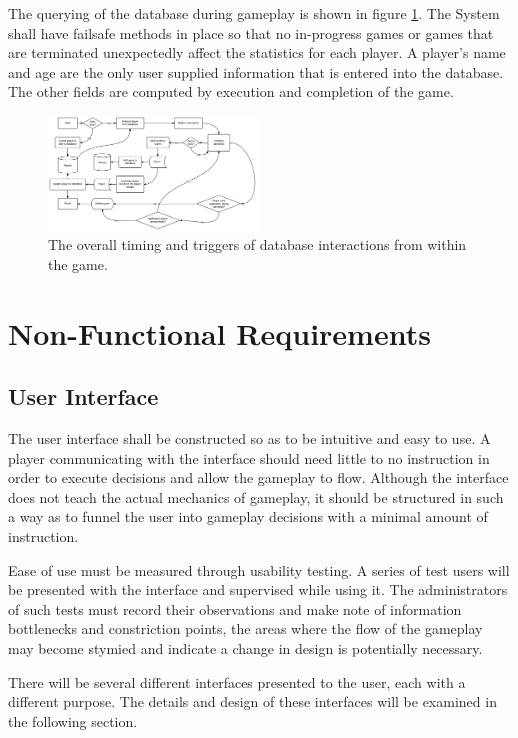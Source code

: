 \documentclass[12pt]{IEEEtran}
\begin{document}
	The querying of the database during gameplay is shown in figure \ref{fig:dbflow}. The System shall have failsafe 			methods in place so that no in-progress games or games that are terminated unexpectedly affect the statistics for each 		player. A player's name and age are the only user supplied information that is entered into the database. The other 			fields are computed by execution and completion of the game.

	\begin{figure}[b]	
		\centering
		\includegraphics[width=0.5\textwidth]{DatabaseFlowChart.png}
		\caption[Database Query Flow]{ The overall timing and triggers of database interactions from within the game.  }
		\label{fig:dbflow}
	\end{figure}


\section{Non-Functional Requirements}
\label{sec:nonFuncReq}

\subsection{User Interface}
\label{subsec:ui}
	The user interface shall be constructed so as to be intuitive and easy to use. A player communicating with the interface should need little to no instruction in order to execute decisions and allow the gameplay to flow. Although the interface does not teach the actual mechanics of gameplay, it should be structured in such a way as to funnel the user into gameplay decisions with a minimal amount of instruction. 
	
	Ease of use must be measured through usability testing. A series of test users will be presented with the interface and supervised while using it. The administrators of such tests must record their observations and make note of information bottlenecks and constriction points, the areas where the flow of the gameplay may become stymied and indicate a change in design is potentially necessary. 
	
	There will be several different interfaces presented to the user, each with a different purpose. The details and design of these interfaces will be examined in the following section. 
	
\end{document}
